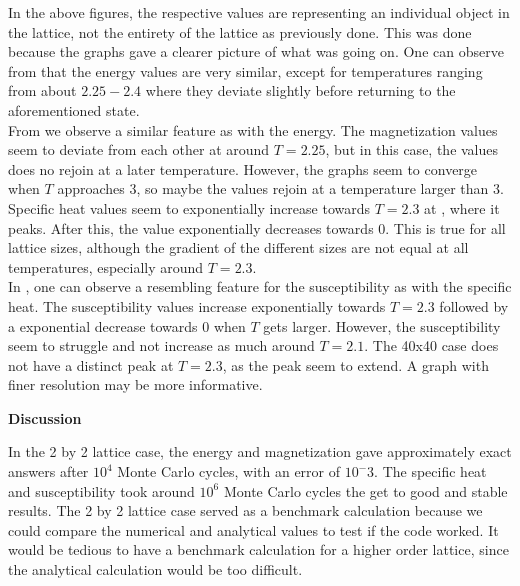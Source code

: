 \documentclass[10pt,a4paper]{article}
\begin{document}
\noindent In the above figures, the respective values are representing an individual object in the lattice, not the entirety of the lattice as previously done. This was done because the graphs gave a clearer picture of what was going on. One can observe from  that the energy values are very similar, except for temperatures ranging from about $2.25 - 2.4$ where they deviate slightly before returning to the aforementioned state.\\


From  we observe a similar feature as with the energy. The magnetization values seem to deviate from each other at around $T = 2.25$, but in this case, the values does no rejoin at a later temperature. However, the graphs seem to converge when $T$ approaches $3$, so maybe the values rejoin at a temperature larger than $3$.\\


Specific heat values seem to exponentially increase towards $T = 2.3$ at , where it peaks. After this, the value exponentially decreases towards $0$. This is true for all lattice sizes, although the gradient of the different sizes are not equal at all temperatures, especially around $T = 2.3$.\\


In , one can observe a resembling feature for the susceptibility as with the specific heat. The susceptibility values increase exponentially towards $T = 2.3$ followed by a exponential decrease towards $0$ when $T$ gets larger. However, the susceptibility seem to struggle and not increase as much around $T = 2.1$. The 40x40 case does not have a distinct peak at $T = 2.3$, as the peak seem to extend. A graph with finer resolution may be more informative. 

\newpage

\begin{center}
{\LARGE\bf Discussion}
\end{center}

\noindent In the 2 by 2 lattice case, the energy and magnetization gave approximately exact answers after $10^4$ Monte Carlo cycles, with an error of $10^-3$. The specific heat and susceptibility took around $10^6$ Monte Carlo cycles the get to good and stable results. The 2 by 2 lattice case served as a benchmark calculation because we could compare the numerical and analytical values to test if the code worked. It would be tedious to have a benchmark calculation for a higher order lattice, since the analytical calculation would be too difficult.\\
\end{document}
